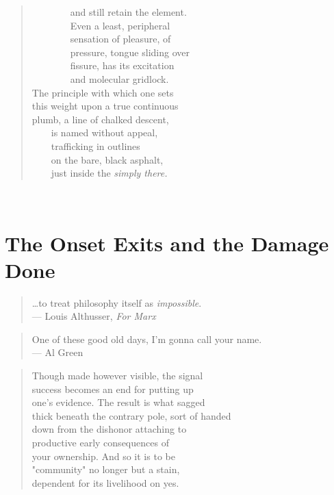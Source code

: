 \documentclass[
]{memoir}
\begin{document}
\begin{verse}
        and still retain the element.\\
        Even a least, peripheral\\
        sensation of pleasure, of\\
        pressure, tongue sliding over\\
        fissure, has its excitation\\
        and molecular gridlock.\\
The principle with which one sets\\
this weight upon a true continuous\\
plumb, a line of chalked descent,\\
    is named without appeal,\\
    trafficking in outlines\\
    on the bare, black asphalt,\\
    just inside the \emph{simply there.}\\
\end{verse}

~

\hypertarget{the-onset-exits-and-the-damage-done}{%
\section*{The Onset Exits and the Damage
Done}\label{the-onset-exits-and-the-damage-done}}

\begin{verse}
…to treat philosophy itself as \emph{impossible}.\\
— Louis Althusser, \emph{For Marx}\\
\end{verse}

\begin{verse}
One of these good old days, I’m gonna call your name.\\
— Al Green\\
\end{verse}

\begin{verse}
Though made however visible, the signal\\
success becomes an end for putting up\\
one’s evidence. The result is what sagged\\
thick beneath the contrary pole, sort of handed\\
down from the dishonor attaching to\\
productive early consequences of\\
your ownership. And so it is to be\\
"community" no longer but a stain,\\
dependent for its livelihood on yes.\\
\end{verse}
\end{document}
